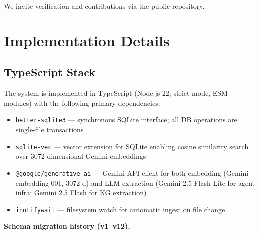 We invite verification and contributions via the public repository.

\appendix

\section{Implementation Details}

\subsection{TypeScript Stack}

The system is implemented in TypeScript (Node.js 22, strict mode, ESM modules) with the
following primary dependencies:

\begin{itemize}
  \item \texttt{better-sqlite3} --- synchronous SQLite interface; all DB operations are
    single-file transactions
  \item \texttt{sqlite-vec} --- vector extension for SQLite enabling cosine similarity
    search over 3072-dimensional Gemini embeddings
  \item \texttt{@google/generative-ai} --- Gemini API client for both embedding
    (Gemini embedding-001, 3072-d) and LLM extraction (Gemini 2.5 Flash Lite for agent
    infra; Gemini 2.5 Flash for KG extraction)
  \item \texttt{inotifywait} --- filesystem watch for automatic ingest on file change
\end{itemize}

\textbf{Schema migration history (v1--v12).}

\begin{table}[!ht]
  \centering
  \caption{Schema migration history (v1--v12)}
  \label{tab:schema-migration}
\end{table}


